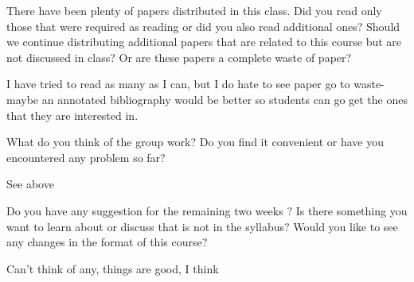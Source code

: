 There have been plenty of papers distributed in this class. Did you read only 
those that were required as reading or did you also read additional ones? 
Should we continue distributing additional papers that are related to this 
course but are not discussed in class? Or are these papers a complete waste of 
paper?

I have tried to read as many as I can, but I do hate to see paper go to waste- 
maybe an annotated bibliography would be better so students can go get the 
ones that they are interested in.

What do you think of the group work? Do you find it convenient or have you 
encountered any problem so far?

See above

Do you have any suggestion for the remaining two weeks ? Is there something 
you want to learn about or discuss that is not in the syllabus? Would you like 
to see any changes in the format of this course?

Can't think of any, things are good, I think

